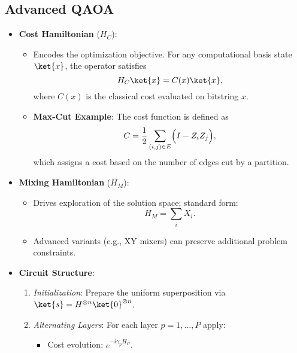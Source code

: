 \begin{multicols}{3}
                  \section*{Advanced QAOA}
                  \begin{itemize}[leftmargin=*,nosep,topsep=0pt]
                    \item \textbf{Cost Hamiltonian} ($H_C$):
                      \begin{itemize}[nosep]
                        \item Encodes the optimization objective. For any computational basis state \(\ket{x}\), the operator satisfies
                          \[
                            H_C \ket{x} = C(x) \ket{x},
                          \]
                          where \(C(x)\) is the classical cost evaluated on bitstring \(x\).
                        \item \textbf{Max-Cut Example}: The cost function is defined as
                          \[
                            C = \frac{1}{2} \sum_{(i,j) \in E} \Bigl(I - Z_i Z_j\Bigr),
                          \]
                          which assigns a cost based on the number of edges cut by a partition.
                      \end{itemize}
                    \item \textbf{Mixing Hamiltonian} ($H_M$):
                      \begin{itemize}[nosep]
                        \item Drives exploration of the solution space; standard form:
                          \[
                            H_M = \sum_i X_i.
                          \]
                        \item Advanced variants (e.g., XY mixers) can preserve additional problem constraints.
                      \end{itemize}
                    \item \textbf{Circuit Structure}:
                      \begin{enumerate}[nosep]
                        \item \textit{Initialization}: Prepare the uniform superposition via \(\ket{s}=H^{\otimes n}\ket{0}^{\otimes n}\).
                        \item \textit{Alternating Layers}: For each layer \(p=1,\dots,P\) apply:
                          \begin{itemize}[nosep]
                            \item Cost evolution: \(e^{-i\gamma_p H_C}\).

\end{itemize}
\end{enumerate}
\end{itemize}
\end{multicols}
